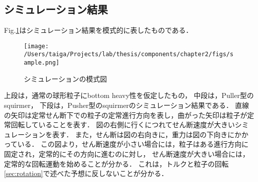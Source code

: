 \subsection{シミュレーション結果}
Fig.\ref{fig:result}はシミュレーション結果を模式的に表したものである．

    \begin{figure}[htbp]
        \centering
        \texttt{[image: /Users/taiga/Projects/lab/thesis/components/chapter2/figs/sample.png]}
        \caption{シミュレーションの模式図}
        \label{fig:result}
    \end{figure}

\noindent
上段は，通常の球形粒子にbottom heavy性を仮定したもの，
中段は，Puller型のsquirmer，
下段は，Pusher型のsquirmerのシミュレーション結果である．
直線の矢印は定常せん断下での粒子の定常進行方向を表し，曲がった矢印は粒子が定常回転していることを表す．
図の右側に行くにつれてせん断速度が大きいシミュレーションを表す．
また，せん断は図の右向きに，重力は図の下向きにかかっている．
この図より，せん断速度が小さい場合には，粒子はある進行方向に固定され，定常的にその方向に進むのに対し，
せん断速度が大きい場合には，定常的な回転運動を始めることが分かる．
これは，トルクと粒子の回転\ref{sec:rotation}で述べた予想に反しないことが分かる．
